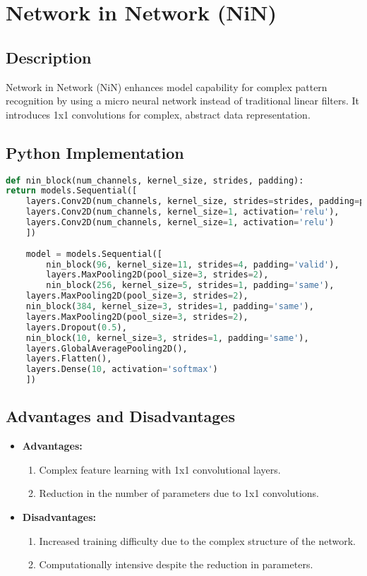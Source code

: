 \chapter{Network in Network (NiN)}

\section{Description}
Network in Network (NiN) enhances model capability for complex pattern recognition by using a micro neural network instead of traditional linear filters. It introduces 1x1 convolutions for complex, abstract data representation.

\section{Python Implementation}
\begin{lstlisting}[language=Python]
def nin_block(num_channels, kernel_size, strides, padding):
return models.Sequential([
    layers.Conv2D(num_channels, kernel_size, strides=strides, padding=padding, activation='relu'),
    layers.Conv2D(num_channels, kernel_size=1, activation='relu'),
    layers.Conv2D(num_channels, kernel_size=1, activation='relu')
    ])
    
    model = models.Sequential([
        nin_block(96, kernel_size=11, strides=4, padding='valid'),
        layers.MaxPooling2D(pool_size=3, strides=2),
        nin_block(256, kernel_size=5, strides=1, padding='same'),
    layers.MaxPooling2D(pool_size=3, strides=2),
    nin_block(384, kernel_size=3, strides=1, padding='same'),
    layers.MaxPooling2D(pool_size=3, strides=2),
    layers.Dropout(0.5),
    nin_block(10, kernel_size=3, strides=1, padding='same'),
    layers.GlobalAveragePooling2D(),
    layers.Flatten(),
    layers.Dense(10, activation='softmax')
    ])
\end{lstlisting}


\section{Advantages and Disadvantages}
\begin{itemize}
    \item \textbf{Advantages:}
    \begin{enumerate}
        \item Complex feature learning with 1x1 convolutional layers.
        \item Reduction in the number of parameters due to 1x1 convolutions.
    \end{enumerate}
    \item \textbf{Disadvantages:}
    \begin{enumerate}
        \item Increased training difficulty due to the complex structure of the network.
        \item Computationally intensive despite the reduction in parameters.
    \end{enumerate}
\end{itemize}

